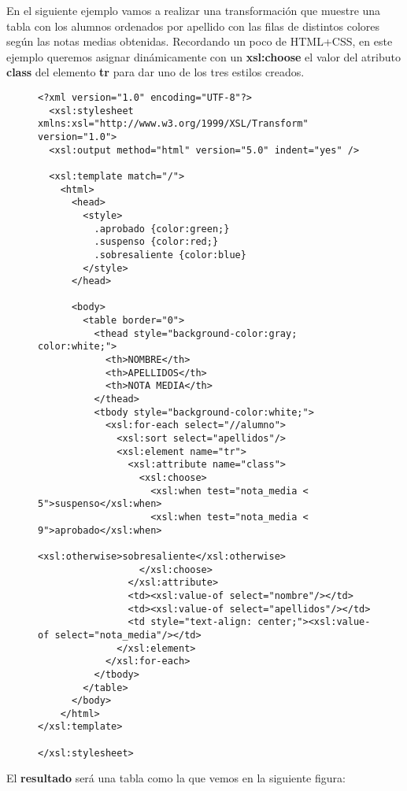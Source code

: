 \begin{itemize}
    En el siguiente ejemplo vamos a realizar una transformación que muestre una tabla con los alumnos ordenados por apellido con las filas de distintos colores según las notas medias obtenidas. Recordando un poco de HTML+CSS, en este ejemplo queremos asignar dinámicamente con un \textbf{xsl:choose} el valor del atributo \textbf{class} del elemento \textbf{tr} para dar uno de los tres estilos creados.

    \begin{figure}[H]
        \begin{tcolorbox}[sharp corners, colback=yellow!30, colframe=white!20]
            \scriptsize
\begin{verbatim}
<?xml version="1.0" encoding="UTF-8"?>
  <xsl:stylesheet xmlns:xsl="http://www.w3.org/1999/XSL/Transform" version="1.0">
  <xsl:output method="html" version="5.0" indent="yes" />

  <xsl:template match="/">
    <html>
      <head>
        <style>
          .aprobado {color:green;}
          .suspenso {color:red;}
          .sobresaliente {color:blue}
        </style>
      </head>

      <body>
        <table border="0">
          <thead style="background-color:gray; color:white;">
            <th>NOMBRE</th>
            <th>APELLIDOS</th>
            <th>NOTA MEDIA</th>
          </thead>
          <tbody style="background-color:white;">
            <xsl:for-each select="//alumno">
              <xsl:sort select="apellidos"/>
              <xsl:element name="tr">
                <xsl:attribute name="class">
                  <xsl:choose>
                    <xsl:when test="nota_media < 5">suspenso</xsl:when>
                    <xsl:when test="nota_media < 9">aprobado</xsl:when>
                    <xsl:otherwise>sobresaliente</xsl:otherwise>
                  </xsl:choose>
                </xsl:attribute>
                <td><xsl:value-of select="nombre"/></td>
                <td><xsl:value-of select="apellidos"/></td>
                <td style="text-align: center;"><xsl:value-of select="nota_media"/></td>
              </xsl:element>
            </xsl:for-each>
          </tbody>
        </table>
      </body>
    </html>
</xsl:template>

</xsl:stylesheet>
\end{verbatim}
        \end{tcolorbox}
    \end{figure}

    El \textbf{resultado} será una tabla como la que vemos en la siguiente figura:


\end{itemize}
